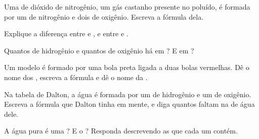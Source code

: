 \begin{exercise}[$\star$]\label{exo:g7:atoms-and-molecules:5}
Uma  de dióxido de nitrogênio, um gás castanho presente no 
poluído, é formada por um  de nitrogênio e dois  de oxigênio.
Escreva a fórmula dela.
\end{exercise}

\begin{exercise}[$\star\star$]\label{exo:g7:atoms-and-molecules:6}
Explique a diferença entre  e , e entre  e
.
\end{exercise}

\begin{exercise}[$\star\star$]\label{exo:g7:atoms-and-molecules:7}
Quantos  de hidrogênio e quantos  de oxigênio há em
? E em ?
\end{exercise}

\begin{exercise}[$\star\star$]\label{exo:g7:atoms-and-molecules:8}
Um modelo é formado por uma bola preta ligada a duas bolas vermelhas. Dê
o nome dos , escreva a fórmula e dê o nome da .
\end{exercise}

\begin{exercise}[$\star\star$]\label{exo:g7:atoms-and-molecules:9}
Na tabela de Dalton, a água é formada por um  de hidrogênio e um
 de oxigênio. Escreva a fórmula que Dalton tinha em mente, e diga
quantos  faltam na  de água dele.
\end{exercise}

\begin{exercise}[$\star\star$]\label{exo:g7:atoms-and-molecules:10}
A água pura é uma ? E o ? Responda descrevendo as  que
cada um contém.
\end{exercise}

